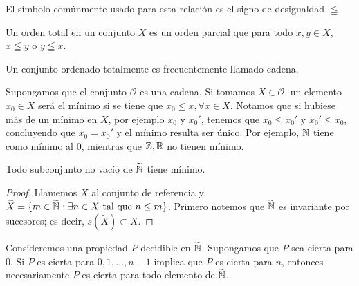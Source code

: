 \documentclass[main.tex]{subfiles}
\begin{document}
\begin{note}
    El s\'imbolo com\'unmente usado para esta relaci\'on es el signo de desigualdad $\leqq$.
\end{note}

\begin{defn}
    Un orden total en un conjunto $X$ es un orden parcial que para todo $x, y \in X$, $x \leqq y$ o $y \leqq x$.
\end{defn}

\begin{note}
    Un conjunto ordenado totalmente es frecuentemente llamado cadena.
\end{note}

Supongamos que el conjunto $\mathcal{O}$ es una cadena. Si tomamos $X \in \mathcal{O}$, un elemento $x_0 \in X$ ser\'a el m\'inimo si se tiene que $x_0 \leq x, \forall x \in X$. Notamos que si hubiese m\'as de un m\'inimo en $X$, por ejemplo $x_0$ y $x_0'$, tenemos que $x_0 \leq x_0'$ y $x_0' \leq x_0$, concluyendo que $x_0 = x_0'$ y el m\'inimo resulta ser \'unico. Por ejemplo, $\mathbb N$ tiene como m\'inimo al $0$, mientras que $\mathbb Z, \mathbb R$ no tienen m\'inimo.

\begin{theorem}
    Todo subconjunto no vac\'io de $\widetilde{\mathbb N}$ tiene m\'inimo.
\end{theorem}

\begin{proof}
    Llamemos $X$ al conjunto de referencia y $\widetilde{X} = \{m \in \widetilde{\mathbb N}: \exists n \in X \text{ tal que } n \leq m\}$.
    Primero notemos que $\widetilde{\mathbb N}$ es invariante por sucesores; es decir, $s(\widetilde{X}) \subset X$.
\end{proof}

\begin{theorem}
    Consideremos una propiedad $P$ decidible en $\widetilde{\mathbb N}$. Supongamos que $P$ sea cierta para $0$. Si $P$ es cierta para $0, 1, \dots, n - 1$ implica que $P$ es cierta para $n$, entonces necesariamente $P$ es cierta para todo elemento de $\widetilde{\mathbb N}$.
\end{theorem}
\end{document}
